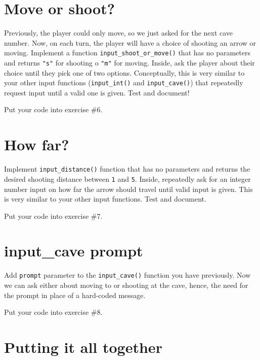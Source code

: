 \documentclass[
]{book}
\begin{document}
\hypertarget{move-or-shoot}{%
\section{Move or shoot?}\label{move-or-shoot}}

Previously, the player could only move, so we just asked for the next cave number. Now, on each turn, the player will have a choice of shooting an arrow or moving. Implement a function \texttt{input\_shoot\_or\_move()} that has no parameters and returns \texttt{"s"} for shooting o \texttt{"m"} for moving. Inside, ask the player about their choice until they pick one of two options. Conceptually, this is very similar to your other input functions (\texttt{input\_int()} and \texttt{input\_cave()}) that repeatedly request input until a valid one is given. Test and document!

Put your code into exercise \#6.

\hypertarget{how-far}{%
\section{How far?}\label{how-far}}

Implement \texttt{input\_distance()} function that has no parameters and returns the desired shooting distance between \texttt{1} and \texttt{5}. Inside, repeatedly ask for an integer number input on how far the arrow should travel until valid input is given. This is very similar to your other input functions. Test and document.

Put your code into exercise \#7.

\hypertarget{input_cave-prompt}{%
\section{input\_cave prompt}\label{input_cave-prompt}}

Add \texttt{prompt} parameter to the \texttt{input\_cave()} function you have previously. Now we can ask either about moving to or shooting at the cave, hence, the need for the prompt in place of a hard-coded message.

Put your code into exercise \#8.

\hypertarget{putting-it-all-together}{%
\section{Putting it all together}\label{putting-it-all-together}}
\end{document}
